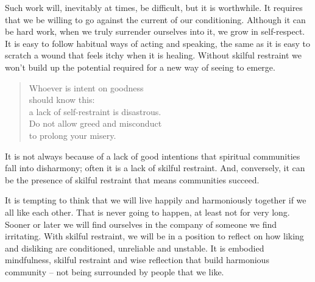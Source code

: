 Such work will, inevitably at times, be difficult, but it is worthwhile.
It requires that we be willing to go against the current of our
conditioning. Although it can be hard work, when we truly surrender
ourselves into it, we grow in self-respect. It is easy to follow
habitual ways of acting and speaking, the same as it is easy to scratch
a wound that feels itchy when it is healing. Without skilful restraint
we won't build up the potential required for a new way of seeing to
emerge.

\begin{quote}
  Whoever is intent on goodness\\
  should know this:\\
  a lack of self-restraint is disastrous.\\
  Do not allow greed and misconduct\\
  to prolong your misery.

\end{quote}

It is not always because of a lack of good intentions that spiritual
communities fall into disharmony; often it is a lack of skilful
restraint. And, conversely, it can be the presence of skilful restraint
that means communities succeed.

It is tempting to think that we will live happily and harmoniously
together if we all like each other. That is never going to happen, at
least not for very long. Sooner or later we will find ourselves in the
company of someone we find irritating. With skilful restraint, we will
be in a position to reflect on how liking and disliking are conditioned,
unreliable and unstable. It is embodied mindfulness, skilful restraint
and wise reflection that build harmonious community -- not being
surrounded by people that we like.

